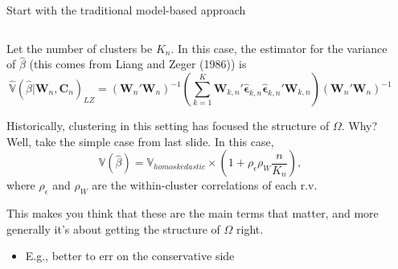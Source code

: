 \documentclass[notes,11pt, aspectratio=169]{beamer}
\newenvironment{wideitemize}{\itemize\addtolength{\itemsep}{10pt}}{\enditemize}
\begin{document}
 
\begin{frame}{Start with the traditional model-based approach}
\begin{columns}[T] %
\begin{column}{.8\textwidth}
  \begin{wideitemize}
  \item Let the number of clusters be $K_{n}$. In this case, the
    estimator for the variance of $\hat{\beta}$ (this comes from Liang
    and Zeger (1986)) is
    \begin{equation}
      \hat{\mathbb{V}}(\hat{\beta} |\mathbf{W}_{n}, \mathbf{C}_{n})_{LZ} = (\mathbf{W}_{n}'\mathbf{W}_{n})^{-1}\left(\sum_{k=1}^{K}\mathbf{W}_{k,n}'\hat{\boldsymbol{\epsilon}}_{k,n}\hat{\boldsymbol{\epsilon}}_{k,n}'\boldsymbol{W}_{k,n}\right) (\mathbf{W}_{n}'\mathbf{W}_{n})^{-1}
    \end{equation}

  \item Historically, clustering in this setting has focused the structure of $\Omega$. Why? Well, take the simple case from last slide. In this case,
    \begin{equation}
      \mathbb{V}(\hat{\beta}) = \mathbb{V}_{homoskedastic}\times \left( 1+ \rho_{\epsilon}\rho_{W}\frac{n}{K_{n}}\right),
    \end{equation}
    where $\rho_{\epsilon}$ and $\rho_{W}$ are the within-cluster correlations of each r.v.
    \vspace{-8pt}
  \item This makes you think that these are the main terms that
    matter, and more generally it's about getting the structure of
    $\Omega$ right.
    \begin{itemize}
  \item E.g., better to err on the conservative side    
    \end{itemize}
  \end{wideitemize}
  \end{column}%
  \hfill%
  \begin{column}{.5\textwidth}
  \end{column}
\end{columns}
\end{frame}
\end{document}
